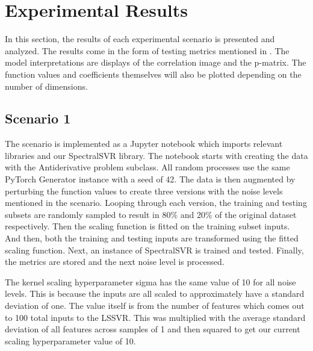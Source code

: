 \section{Experimental Results}\label{sec:experimental_results}
\noindent In this section, the results of each experimental scenario is presented and analyzed. The results come in the form of testing metrics mentioned in . The model interpretations are displays of the correlation image and the p-matrix. The function values and coefficients themselves will also be plotted depending on the number of dimensions.

\subsection{Scenario 1}
\noindent The scenario is implemented as a Jupyter notebook which imports relevant libraries and our SpectralSVR library. The notebook starts with creating the data with the Antiderivative problem subclass. All random processes use the same PyTorch Generator instance with a seed of 42. The data is then augmented by perturbing the function values to create three versions with the noise levels mentioned in the scenario. Looping through each version, the training and testing subsets are randomly sampled to result in 80\% and 20\% of the original dataset respectively. Then the scaling function is fitted on the training subset inputs. And then, both the training and testing inputs are transformed using the fitted scaling function. Next, an instance of SpectralSVR is trained and tested. Finally, the metrics are stored and the next noise level is processed.

The kernel scaling hyperparameter sigma has the same value of 10 for all noise levels. This is because the inputs are all scaled to approximately have a standard deviation of one. The value itself is from the number of features which comes out to 100 total inputs to the LSSVR\@. This was multiplied with the average standard deviation of all features across samples of 1 and then squared to get our current scaling hyperparameter value of 10.


